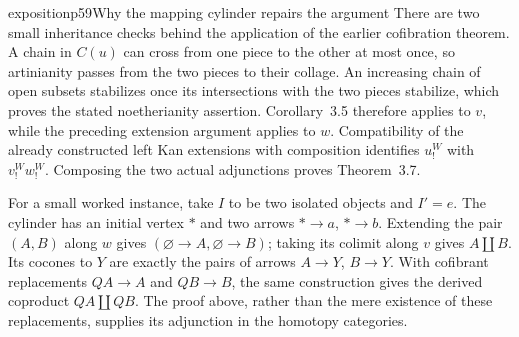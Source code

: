 \begin{dcomment}{exposition}{p59}{Why the mapping cylinder repairs the argument}
There are two small inheritance checks behind the application of the earlier cofibration theorem. A chain in $C(u)$ can cross from one piece to the other at most once, so artinianity passes from the two pieces to their collage. An increasing chain of open subsets stabilizes once its intersections with the two pieces stabilize, which proves the stated noetherianity assertion. Corollary~3.5 therefore applies to $v$, while the preceding extension argument applies to $w$. Compatibility of the already constructed left Kan extensions with composition identifies $u_!^W$ with $v_!^Ww_!^W$. Composing the two actual adjunctions proves Theorem~3.7.

For a small worked instance, take $I$ to be two isolated objects and $I'=e$. The cylinder has an initial vertex $*$ and two arrows $*\to a$, $*\to b$. Extending the pair $(A,B)$ along $w$ gives $(\varnothing\to A,\varnothing\to B)$; taking its colimit along $v$ gives $A\amalg B$. Its cocones to $Y$ are exactly the pairs of arrows $A\to Y$, $B\to Y$. With cofibrant replacements $QA\to A$ and $QB\to B$, the same construction gives the derived coproduct $QA\amalg QB$. The proof above, rather than the mere existence of these replacements, supplies its adjunction in the homotopy categories.
\end{dcomment}


